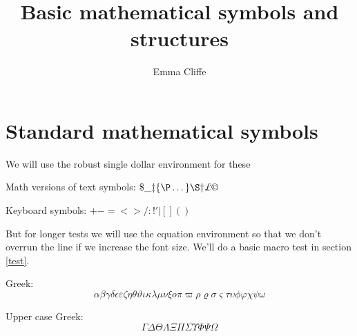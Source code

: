 


\title{Basic mathematical symbols and structures}
\author{Emma Cliffe}
\date{}

\usepackage{calc}
\usepackage{longtable}
\usepackage{tabu}
\usepackage{breqn}
\setlength{\arraycolsep}{0.800000em}
\renewcommand{\arraystretch}{1.400000}

\renewcommand{\baselinestretch}{1.250000}
\selectfont
\setlength{\parskip}{1.0\baselineskip}

\maketitle
\tableofcontents
{}

\section{Standard mathematical symbols}

We will use the robust single dollar environment for these

Math versions of text symbols: \(\$  \_  \ddag  \{  \P  \dots  \}  \S  \dag  \pounds \copyright\)

Keyboard symbols: \(+  -  =  <  >  /  :  !  '  |  [  ]  (  )\)

\noindent 
But for longer tests we will use the equation environment so that we don't overrun the line if we increase the font size. We'll do a basic macro test in section \ref{test}.

Greek:
\begin{dmath}[compact,spread={1.250000\baselineskip}] \alpha  \beta  \gamma  \delta  \epsilon  \varepsilon  \zeta  \eta  \theta  \vartheta  \iota  \kappa  \lambda  \mu  \nu  \xi  o  \pi  \varpi  \rho  \varrho  \sigma  \varsigma  \tau  \upsilon  \phi  \varphi  \chi  \psi  \omega \end{dmath}%

Upper case Greek:
\begin{dmath}[compact,spread={1.250000\baselineskip}] \Gamma  \Delta  \Theta  \Lambda  \Xi  \Pi  \Sigma  \Upsilon  \Phi  \Psi  \Omega \end{dmath}

